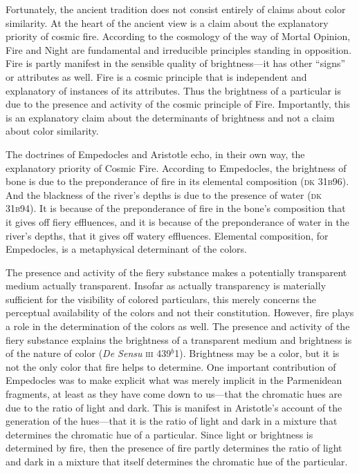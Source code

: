 Fortunately, the ancient tradition does not consist entirely of claims about color similarity. At the heart of the ancient view is a claim about the explanatory priority of cosmic fire. According to the cosmology of the way of Mortal Opinion, Fire and Night are fundamental and irreducible principles standing in opposition. Fire is partly manifest in the sensible quality of brightness---it has other ``signs'' or attributes as well. Fire is a cosmic principle that is independent and explanatory of instances of its attributes. Thus the brightness of a particular is due to the presence and activity of the cosmic principle of Fire. Importantly, this is an explanatory claim about the determinants of brightness and not a claim about color similarity. 

The doctrines of Empedocles and Aristotle echo, in their own way, the explanatory priority of Cosmic Fire. According to Empedocles, the brightness of bone is due to the preponderance of fire in its elemental composition (\textsc{dk} 31\textsc{b}96). And the blackness of the river's depths is due to the presence of water (\textsc{dk} 31\textsc{b}94). It is because of the preponderance of fire in the bone's composition that it gives off fiery effluences, and it is because of the preponderance of water in the river's depths, that it gives off watery effluences. Elemental composition, for Empedocles, is a metaphysical determinant of the colors.

The presence and activity of the fiery substance makes a potentially transparent medium actually transparent. Insofar as actually transparency is materially sufficient for the visibility of colored particulars, this merely concerns the perceptual availability of the colors and not their constitution. However, fire plays a role in the determination of the colors as well. The presence and activity of the fiery substance explains the brightness of a transparent medium and brightness is of the nature of color (\emph{De Sensu} \textsc{iii} 439\( ^{b} \)1). Brightness may be a color, but it is not the only color that fire helps to determine. One important contribution of Empedocles was to make explicit what was merely implicit in the Parmenidean fragments, at least as they have come down to us---that the chromatic hues are due to the ratio of light and dark. This is manifest in Aristotle's account of the generation of the hues---that it is the ratio of light and dark in a mixture that determines the chromatic hue of a particular. Since light or brightness is determined by fire, then the presence of fire partly determines the ratio of light and dark in a mixture that itself determines the chromatic hue of the particular.

